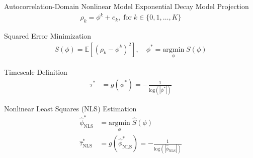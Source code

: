 \documentclass[8pt,aspectratio=169]{beamer}
\begin{document}
\begin{frame}{Autocorrelation-Domain Nonlinear Model}
\vfill
Exponential Decay Model Projection
\begin{align}\label{eq:nlm}
    \rho_k = \phi^k + e_k, \; \text{for}\; k \in \{0, 1, \ldots, K\}
\end{align}

Squared Error Minimization
\begin{align}\label{eq:nlm_loss}
    S(\phi) = \mathbb{E}[(\rho_k - \phi^k)^2], \quad \phi^* = \underset{\phi}{\text{argmin}} \; S(\phi)
\end{align}

Timescale Definition
\begin{align}
    \tau^* &= g(\phi^*) = -\frac{1}{\text{log}(|\phi^*|)} \label{eq:nlm-tau}
\end{align}

Nonlinear Least Squares (NLS) Estimation
\begin{align}
    \hat \phi^*_{\scriptscriptstyle\text{NLS}} &= \underset{\phi}{\text{argmin}} \; \widehat{S}(\phi) \label{eq:nls_phi_}\\
    \hat \tau^*_{\scriptscriptstyle\text{NLS}} &= g(\hat \phi^*_{\scriptscriptstyle\text{NLS}}) = -\frac{1}{\text{log}(|\hat\phi_{\scriptscriptstyle\text{NLS}}|)}
\end{align}

\end{frame}
\end{document}
